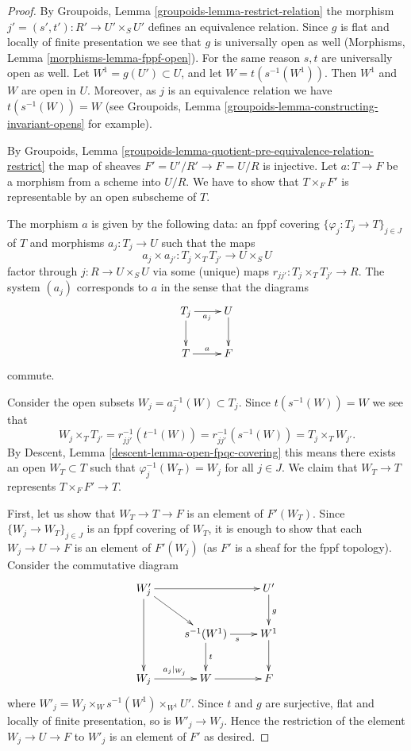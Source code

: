 \documentclass{stacks-project}
\theoremstyle{plain}
\theoremstyle{definition}
\theoremstyle{remark}
\numberwithin{equation}{subsection}
\begin{document}
\begin{proof}
By Groupoids, Lemma \ref{groupoids-lemma-restrict-relation}
the morphism $j' = (s', t') : R' \to U' \times_S U'$
defines an equivalence relation. Since $g$ is flat and locally of
finite presentation we see that $g$ is universally open as well
(Morphisms, Lemma \ref{morphisms-lemma-fppf-open}).
For the same reason $s, t$ are universally open as well.
Let $W^1 = g(U') \subset U$, and let $W = t(s^{-1}(W^1))$.
Then $W^1$ and $W$ are open in $U$. Moreover, as $j$ is an
equivalence relation we have $t(s^{-1}(W)) = W$ (see
Groupoids, Lemma \ref{groupoids-lemma-constructing-invariant-opens}
for example).

\medskip\noindent
By
Groupoids,
Lemma \ref{groupoids-lemma-quotient-pre-equivalence-relation-restrict}
the map of sheaves $F' = U'/R' \to F = U/R$ is injective.
Let $a : T \to F$ be a morphism from a scheme into $U/R$.
We have to show that $T \times_F F'$ is representable
by an open subscheme of $T$.

\medskip\noindent
The morphism $a$ is given by the following data:
an fppf covering $\{\varphi_j : T_j \to T\}_{j \in J}$ of $T$ and
morphisms $a_j : T_j \to U$ such that the maps
$$
a_j \times a_{j'} :
T_j \times_T T_{j'}
\longrightarrow
U \times_S U
$$
factor through $j : R \to U \times_S U$ via some (unique) maps
$r_{jj'} : T_j \times_T T_{j'} \to R$. The system
$(a_j)$ corresponds to $a$ in the sense that the diagrams
$$
\xymatrix{
T_j \ar[r]_{a_j} \ar[d] & U \ar[d] \\
T \ar[r]^a & F
}
$$
commute.

\medskip\noindent
Consider the open subsets $W_j = a_j^{-1}(W) \subset T_j$.
Since $t(s^{-1}(W)) = W$ we see that
$$
W_j \times_T T_{j'} =
r_{jj'}^{-1}(t^{-1}(W)) = r_{jj'}^{-1}(s^{-1}(W)) =
T_j \times_T W_{j'}.
$$
By
Descent, Lemma \ref{descent-lemma-open-fpqc-covering}
this means there exists an open
$W_T \subset T$ such that $\varphi_j^{-1}(W_T) = W_j$ for all $j \in J$.
We claim that $W_T \to T$ represents $T \times_F F' \to T$.

\medskip\noindent
First, let us show that $W_T \to T \to F$ is an element of
$F'(W_T)$. Since $\{W_j \to W_T\}_{j \in J}$ is an
fppf covering of $W_T$, it is enough to show that
each $W_j \to U \to F$ is an element of $F'(W_j)$ (as $F'$ is a sheaf
for the fppf topology). Consider the commutative diagram
$$
\xymatrix{
W'_j \ar[rr] \ar[dd] \ar[rd] & & U' \ar[d]^g \\
& s^{-1}(W^1) \ar[r]_s \ar[d]^t & W^1 \ar[d] \\
W_j \ar[r]^{a_j|_{W_j}} & W \ar[r] & F
}
$$
where $W'_j = W_j \times_W s^{-1}(W^1) \times_{W^1} U'$.
Since $t$ and $g$ are surjective, flat and locally of finite
presentation, so is $W'_j \to W_j$. Hence the restriction of
the element $W_j \to U \to F$ to $W'_j$ is an element of $F'$
as desired.


\end{proof}
\end{document}
